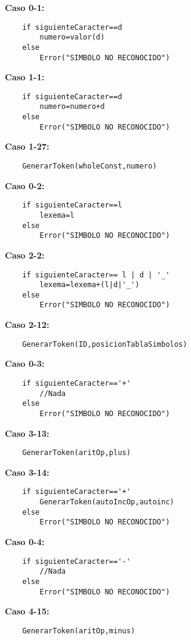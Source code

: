 \documentclass{article}
\begin{document}
\textbf{Caso 0-1:}
\begin{verbatim}
    if siguienteCaracter==d
        numero=valor(d)
    else
        Error("SIMBOLO NO RECONOCIDO")
\end{verbatim}

\textbf{Caso 1-1:}
\begin{verbatim}
    if siguienteCaracter==d
        numero=numero+d
    else 
        Error("SIMBOLO NO RECONOCIDO")
\end{verbatim}

\textbf{Caso 1-27:}
\begin{verbatim}
    GenerarToken(wholeConst,numero)
\end{verbatim}

\textbf{Caso 0-2:}
\begin{verbatim}
    if siguienteCaracter==l 
        lexema=l
    else 
        Error("SIMBOLO NO RECONOCIDO")
\end{verbatim}

\textbf{Caso 2-2:}
\begin{verbatim}
    if siguienteCaracter== l | d | '_' 
        lexema=lexema+(l|d|'_')
    else 
        Error("SIMBOLO NO RECONOCIDO")
\end{verbatim}

\textbf{Caso 2-12:}
\begin{verbatim}
    GenerarToken(ID,posicionTablaSimbolos)
\end{verbatim}

\textbf{Caso 0-3:}
\begin{verbatim}
    if siguienteCaracter=='+'
        //Nada
    else
        Error("SIMBOLO NO RECONOCIDO")
\end{verbatim}

\textbf{Caso 3-13:}
\begin{verbatim}
    GenerarToken(aritOp,plus)
\end{verbatim}

\textbf{Caso 3-14:}
\begin{verbatim}
    if siguienteCaracter=='+'
        GenerarToken(autoIncOp,autoinc)
    else 
        Error("SIMBOLO NO RECONOCIDO")
\end{verbatim}

\textbf{Caso 0-4:}
\begin{verbatim}
    if siguienteCaracter=='-'
        //Nada
    else
        Error("SIMBOLO NO RECONOCIDO")
\end{verbatim}

\textbf{Caso 4-15:}
\begin{verbatim}
    GenerarToken(aritOp,minus)
\end{verbatim}
\end{document}
